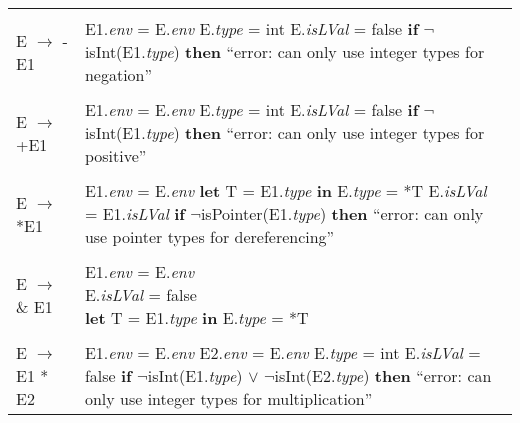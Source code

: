 \documentclass{article}
\begin{document}
\begin{center}
\begin{longtable}{ |l|l| }
     & \\
    
    E $\rightarrow$ -E1 & \makecell[l]{E1.\textit{env} = E.\textit{env} \\ E.\textit{type} = int \\ E.\textit{isLVal} = false \\ \textbf{if} $\neg$isInt(E1.\textit{type}) \textbf{then} ``error: can only use integer \\ types for negation''} \\
    
     & \\
    
    E $\rightarrow$ +E1 & \makecell[l]{E1.\textit{env} = E.\textit{env} \\ E.\textit{type} = int \\ E.\textit{isLVal} = false \\ \textbf{if} $\neg$isInt(E1.\textit{type}) \textbf{then} ``error: can only use integer \\ types for positive''} \\
    
     & \\
    
    E $\rightarrow$ *E1 & \makecell[l]{E1.\textit{env} = E.\textit{env} \\ \textbf{let} T = E1.\textit{type} \textbf{in} E.\textit{type} = *T \\ E.\textit{isLVal} = E1.\textit{isLVal} \\ \textbf{if} $\neg$isPointer(E1.\textit{type}) \textbf{then} ``error: can only use pointer \\ types for dereferencing''} \\
    
     & \\
    
    E $\rightarrow$ $\&$ E1 & \makecell[l]{E1.\textit{env} = E.\textit{env} \\ E.\textit{isLVal} = false \\ \textbf{let} T = E1.\textit{type} \textbf{in} E.\textit{type} = *T} \\
    
     & \\
    
    E $\rightarrow$ E1 * E2 & \makecell[l]{E1.\textit{env} = E.\textit{env} \\ E2.\textit{env} = E.\textit{env} \\ E.\textit{type} = int \\ E.\textit{isLVal} = false \\ \textbf{if} $\neg$isInt(E1.\textit{type}) $\lor$ $\neg$isInt(E2.\textit{type}) \\ \textbf{then} ``error: can only use integer types for \\ multiplication''} \\
    

\end{longtable}
\end{center}
\end{document}

